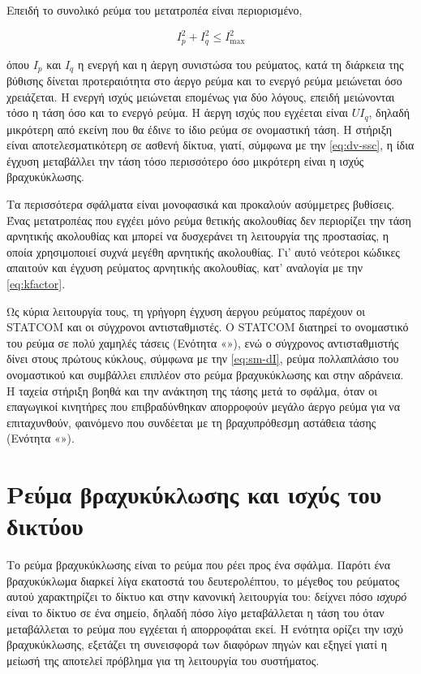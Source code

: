 Επειδή το συνολικό ρεύμα του μετατροπέα είναι περιορισμένο,

\begin{equation}
I_p^2 + I_q^2 \le I_{\max}^2
\label{eq:ilimit}
\end{equation}

όπου $I_p$ και $I_q$ η ενεργή και η άεργη συνιστώσα του ρεύματος, κατά τη διάρκεια της βύθισης
δίνεται προτεραιότητα στο άεργο ρεύμα και το ενεργό ρεύμα μειώνεται όσο χρειάζεται. Η ενεργή
ισχύς μειώνεται επομένως για δύο λόγους, επειδή μειώνονται τόσο η τάση όσο και το ενεργό ρεύμα.
Η άεργη ισχύς που εγχέεται είναι $U I_q$, δηλαδή μικρότερη από εκείνη που θα έδινε το ίδιο
ρεύμα σε ονομαστική τάση. Η στήριξη είναι αποτελεσματικότερη σε ασθενή δίκτυα, γιατί, σύμφωνα με
την \eqref{eq:dv-ssc}, η ίδια έγχυση μεταβάλλει την τάση τόσο περισσότερο όσο μικρότερη είναι η
ισχύς βραχυκύκλωσης.

Τα περισσότερα σφάλματα είναι μονοφασικά και προκαλούν ασύμμετρες βυθίσεις. Ένας μετατροπέας
που εγχέει μόνο ρεύμα θετικής ακολουθίας δεν περιορίζει την τάση αρνητικής ακολουθίας και
μπορεί να δυσχεράνει τη λειτουργία της προστασίας, η οποία χρησιμοποιεί συχνά μεγέθη αρνητικής
ακολουθίας. Γι' αυτό νεότεροι κώδικες απαιτούν και έγχυση ρεύματος αρνητικής ακολουθίας, κατ'
αναλογία με την \eqref{eq:kfactor}.

Ως κύρια λειτουργία τους, τη γρήγορη έγχυση άεργου ρεύματος παρέχουν οι STATCOM και οι
σύγχρονοι αντισταθμιστές. Ο STATCOM διατηρεί το ονομαστικό του ρεύμα σε πολύ χαμηλές τάσεις
(Ενότητα «»), ενώ ο σύγχρονος αντισταθμιστής δίνει στους πρώτους κύκλους,
σύμφωνα με την \eqref{eq:sm-dI}, ρεύμα πολλαπλάσιο του ονομαστικού και συμβάλλει επιπλέον στο
ρεύμα βραχυκύκλωσης και στην αδράνεια. Η ταχεία στήριξη βοηθά και την ανάκτηση της τάσης μετά
το σφάλμα, όταν οι επαγωγικοί κινητήρες που επιβραδύνθηκαν απορροφούν μεγάλο άεργο ρεύμα για να
επιταχυνθούν, φαινόμενο που συνδέεται με τη βραχυπρόθεσμη αστάθεια τάσης (Ενότητα
«»).

\section{Ρεύμα βραχυκύκλωσης και ισχύς του δικτύου}
\label{sec:ssc}

Το ρεύμα βραχυκύκλωσης είναι το ρεύμα που ρέει προς ένα σφάλμα. Παρότι ένα βραχυκύκλωμα
διαρκεί λίγα εκατοστά του δευτερολέπτου, το μέγεθος του ρεύματος αυτού χαρακτηρίζει το δίκτυο
και στην κανονική λειτουργία του: δείχνει πόσο \emph{ισχυρό} είναι το δίκτυο σε ένα σημείο,
δηλαδή πόσο λίγο μεταβάλλεται η τάση του όταν μεταβάλλεται το ρεύμα που εγχέεται ή απορροφάται
εκεί. Η ενότητα ορίζει την ισχύ βραχυκύκλωσης, εξετάζει τη συνεισφορά των διαφόρων πηγών και
εξηγεί γιατί η μείωσή της αποτελεί πρόβλημα για τη λειτουργία του συστήματος.

